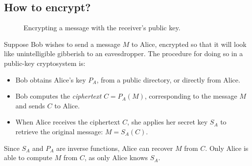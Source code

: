 \subsection{How to encrypt?}

\begin{figure}[h]
\centering
{}
\caption{Encrypting a message with the receiver's public key.}
\end{figure}

Suppose Bob wishes to send a message $M$ to Alice, encrypted so that it will look like unintelligible gibberish to an eavesdropper. The procedure for doing so in a public-key cryptosystem is:

\begin{itemize}
\item Bob obtains Alice's key $P_A$, from a public directory, or directly from Alice.
\item Bob computes the \textit{ciphertext} $C = P_A(M)$, corresponding to the message $M$ and sends $C$ to Alice.
\item When Alice receives the ciphertext $C$, she applies her secret key $S_A$ to retrieve the original message: $M = S_A(C)$.
\end{itemize}

Since $S_A$ and $P_A$ are inverse functions, Alice can recover $M$ from $C$. Only Alice is able to compute $M$ from $C$, as only Alice knows $S_A$.

